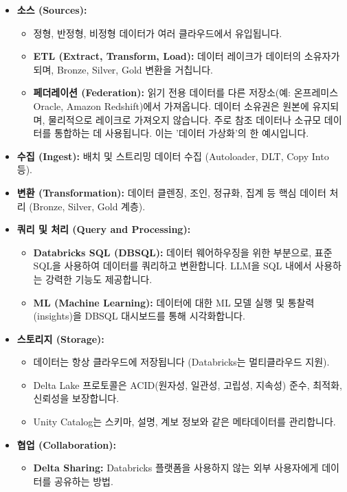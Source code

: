 \documentclass[11pt,a4paper]{article}
\theoremstyle{definition}
\begin{document}
\begin{itemize}
    \item \textbf{소스 (Sources):}
    \begin{itemize}
        \item 정형, 반정형, 비정형 데이터가 여러 클라우드에서 유입됩니다.
        \item \textbf{ETL (Extract, Transform, Load):} 데이터 레이크가 데이터의 소유자가 되며, Bronze, Silver, Gold 변환을 거칩니다.
        \item \textbf{페더레이션 (Federation):} 읽기 전용 데이터를 다른 저장소(예: 온프레미스 Oracle, Amazon Redshift)에서 가져옵니다. 데이터 소유권은 원본에 유지되며, 물리적으로 레이크로 가져오지 않습니다. 주로 참조 데이터나 소규모 데이터를 통합하는 데 사용됩니다. 이는 '데이터 가상화'의 한 예시입니다.
    \end{itemize}
    \item \textbf{수집 (Ingest):} 배치 및 스트리밍 데이터 수집 (Autoloader, DLT, Copy Into 등).
    \item \textbf{변환 (Transformation):} 데이터 클렌징, 조인, 정규화, 집계 등 핵심 데이터 처리 (Bronze, Silver, Gold 계층).
    \item \textbf{쿼리 및 처리 (Query and Processing):}
    \begin{itemize}
        \item \textbf{Databricks SQL (DBSQL):} 데이터 웨어하우징을 위한 부분으로, 표준 SQL을 사용하여 데이터를 쿼리하고 변환합니다. LLM을 SQL 내에서 사용하는 강력한 기능도 제공합니다.
        \item \textbf{ML (Machine Learning):} 데이터에 대한 ML 모델 실행 및 통찰력(insights)을 DBSQL 대시보드를 통해 시각화합니다.
    \end{itemize}
    \item \textbf{스토리지 (Storage):}
    \begin{itemize}
        \item 데이터는 항상 클라우드에 저장됩니다 (Databricks는 멀티클라우드 지원).
        \item Delta Lake 프로토콜은 ACID(원자성, 일관성, 고립성, 지속성) 준수, 최적화, 신뢰성을 보장합니다.
        \item Unity Catalog는 스키마, 설명, 계보 정보와 같은 메타데이터를 관리합니다.
    \end{itemize}
    \item \textbf{협업 (Collaboration):}
    \begin{itemize}
        \item \textbf{Delta Sharing:} Databricks 플랫폼을 사용하지 않는 외부 사용자에게 데이터를 공유하는 방법.

\end{itemize}
\end{itemize}
\end{document}
